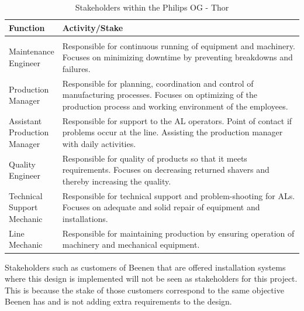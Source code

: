 \begin{table}[ht]
\begin{center}
\caption[Stakeholders within the Philips OG - Thor]{Stakeholders within the Philips OG - Thor} \vspace{0.3cm}
\label{tab:philips employees}
\begin{tabular}[width=\textwidth]{ p{} | p{}}
Function & Activity/Stake \\ [1ex]
\hline \\
\parbox[t]{0.15\textwidth}{Maintenance\\Engineer} & Responsible for continuous running of equipment and machinery. Focuses on minimizing downtime by preventing breakdowns and failures.\\ [2ex]
\parbox[t]{0.15\textwidth}{Production\\Manager} & Responsible for planning, coordination and control of manufacturing processes. Focuses on optimizing of the production process and working environment of the employees. \\ [2ex]
\parbox[t]{0.15\textwidth}{Assistant\\Production\\Manager} & Responsible for support to the AL operators. Point of contact if problems occur at the line. Assisting the production manager with daily activities.\\ [2ex]
\parbox[t]{0.15\textwidth}{Quality\\Engineer} & Responsible for quality of products so that it meets requirements. Focuses on decreasing returned shavers and thereby increasing the quality.\\ [2ex]
\parbox[t]{0.15\textwidth}{Technical\\Support\\Mechanic} & Responsible for technical support and problem-shooting for ALs. Focuses on adequate and solid repair of equipment and installations.\\ [2ex]
\parbox[t]{0.15\textwidth}{Line\\Mechanic} & Responsible for maintaining production by ensuring operation of machinery and mechanical equipment. \\
\end{tabular}
\end{center}
\end{table}

Stakeholders such as customers of Beenen that are offered installation systems where this design is implemented will not be seen as stakeholders for this project. This is because the stake of those customers correspond to the same objective Beenen has and is not adding extra requirements to the design.

